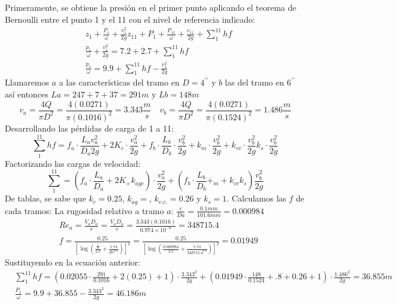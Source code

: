 Primeramente, se obtiene la presión en el primer punto aplicando el teorema de Bernoulli entre el punto 1 y el 11 con el nivel de referencia indicado:
\begin{align*}
    &z_1 + \frac{P_1}{\omega} + \frac{v_1^2}{2g} z_{11} +P_1 + \frac{P_{11}}{\omega} + \frac{v_{11}}{2g} +\sum_1^{11}hf\\
    &\frac{p_1}{\omega} + \frac{v_1^2}{2g} =7.2 +2.7+\sum_1^{11}hf\\
    &\frac{p_1}{\omega} =9.9 +\sum_1^{11}hf- \frac{v_1^2}{2g}
\end{align*}
Llamaremos $a$ a las características del tramo en $D=4^{\prime\prime}$ y $b$ las del tramo en $6^{\prime\prime}$ así entonces $La=247+7+37=291m$ y $Lb=148m$
\begin{equation*}
    v_a = \frac{4Q}{\pi D^2} = \frac{4(0.0271)}{\pi(0.1016)^2} =3.343\frac{m}{s}\quad v_b = \frac{4Q}{\pi D^2} = \frac{4(0.0271)}{\pi(0.1524)^2} = 1.486\frac{m}{s}
\end{equation*}
Desarrollando las pérdidas de carga de 1 a 11:
\begin{equation*}
    \sum_1^{11}hf =f_a\cdot \frac{L_a v_a^2}{D_a 2g}+2K_c\cdot \frac{v^2_a}{2g} + f_b\cdot \frac{L_b}{D_b}\cdot \frac{v_b^2}{2g} +k_m\cdot \frac{v_b^2}{2g} + k_{vc}\cdot \frac{v_b^2}{2g} k_s\cdot \frac{v_b^2}{2g}
\end{equation*}
Factorizando las cargas de velocidad:
\begin{equation*}
    \sum_{1}^{11}=\left(f_a\cdot \frac{L_a}{D_a} +2K_ + k_{agc} \right)\cdot \frac{v_a^2}{2g} +\left(f_b\cdot\frac{L_b}{D_b} + _m + k_{vc} k_s\right)\frac{v_b^2}{2g}
\end{equation*}
De tablas, se sabe que $k_c=0.25$, $k_{ag}=$, $k_{v.c.}=0.26$ y $k_s=1$. Calculamos las $f$ de cada tramos:
La rugosidad relativo a tramo $a$: $\frac{\epsilon}{Da}=\frac{0.1mm}{101.6mm}=0.000984$
\begin{align*}
    &Re_a = \frac{V_aD_a}{v} = \frac{V_aD_a}{v} = \frac{3.343(0.1016)}{0.974 \times 10^{ -6}} = 348715.4\\
    &f =\frac{0.25}{\left[\log{\left(\frac{\frac{\epsilon}{D}}{3.7} +\frac{5.74}{Re^{0.9}}\right)} \right]^2} =\frac{0.25}{\left[\log{\left(\frac{0.000984}{3.7} +\frac{5.74}{348715.4^{0.9}}\right)} \right]^2} =0.01949
\end{align*}
Sustituyendo en la ecuación anterior:
\begin{align*}
    &\sum_1^{11}hf =\left(0.02055\cdot \frac{291}{0.1016} + 2(0.25) + 1\right)\cdot \frac{3.343^2}{2g} +\left(0.01949\cdot \frac{148}{0.1524} + .8 + 0.26 + 1\right)\cdot\frac{1.486^2}{2g} = 36.855m\\
    &\frac{P_1}{\omega} = 9.9 + 36.855 - \frac{3.343^2}{2g} =46.186m
\end{align*}

